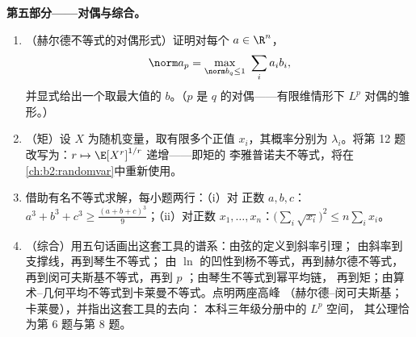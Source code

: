 \begin{problem}
\medskip
\noindent\textbf{第五部分——对偶与综合。}
\begin{enumerate}[resume]
  \item （赫尔德不等式的对偶形式）证明对每个 $a \in
        \R^n$，
        \[
        \norm a_p = \max_{\norm b_q \leq 1}\ \sum_i a_ib_i ,
        \]
        并显式给出一个取最大值的 $b$。（$p$ 
        是 $q$ 的对偶——有限维情形下
        $L^p$ 对偶的雏形。）
  \item （矩）设 $X$ 为随机变量，取有限多个正值
        $x_i$，其概率分别为
        $\lambda_i$。将第 12 题改写为：$r \mapsto
        \E[X^r]^{1/r}$ 递增——即矩的
        李雅普诺夫不等式，将在
        \cref{ch:b2:randomvar}中重新使用。
  \item 借助有名不等式求解，每小题两行：（i）对
        正数 $a, b, c$：$a^3 + b^3 + c^3 \geq
        \frac{(a+b+c)^3}{9}$；（ii）对正数 $x_1, \dots,
        x_n$：$\bigl(\sum_i\sqrt{x_i}\bigr)^2 \leq
        n\sum_i x_i$。
  \item （综合）用五句话画出这套工具的谱系：由弦的定义到斜率引理；
        由斜率到支撑线，再到琴生不等式；
        由 $\ln$ 的凹性到杨不等式，再到赫尔德不等式，
        再到闵可夫斯基不等式，再到 $p$ ；由琴生不等式到幂平均链，
        再到矩；由算术--几何平均不等式到卡莱曼不等式。点明两座高峰
        （赫尔德--闵可夫斯基；卡莱曼），并指出这套工具的去向：
        本科三年级分册中的 $L^p$ 空间，
        其公理恰为第 6 题与第 8 题。
\end{enumerate}
\end{problem}
